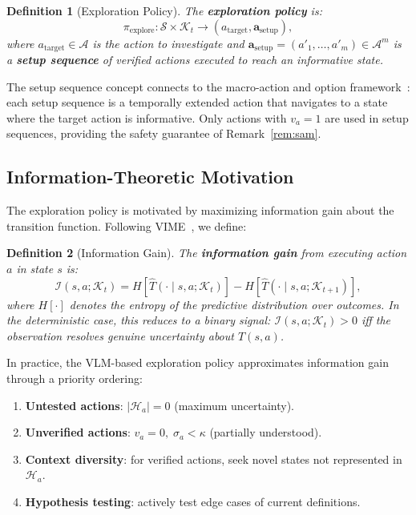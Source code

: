 \documentclass{article}
\newtheorem{definition}{Definition}
\newcommand{\calS}{\mathcal{S}}
\newcommand{\calA}{\mathcal{A}}
\newcommand{\calH}{\mathcal{H}}
\newcommand{\calI}{\mathcal{I}}
\newcommand{\calK}{\mathcal{K}}
\begin{document}
\begin{definition}[Exploration Policy]
\label{def:explore_policy}
The \textbf{exploration policy} is:
\begin{equation}
\pi_{\text{explore}} : \calS \times \calK_t \longrightarrow (a_{\text{target}}, \mathbf{a}_{\text{setup}}),
\end{equation}
where $a_{\text{target}} \in \calA$ is the action to investigate and $\mathbf{a}_{\text{setup}} = (a'_1, \ldots, a'_m) \in \calA^m$ is a \textbf{setup sequence} of verified actions executed to reach an informative state.
\end{definition}

The setup sequence concept connects to the macro-action and option framework~\cite{sutton1999between}: each setup sequence is a temporally extended action that navigates to a state where the target action is informative.  Only actions with $v_a = 1$ are used in setup sequences, providing the safety guarantee of Remark~\ref{rem:sam}.

\subsection{Information-Theoretic Motivation}
\label{sec:info_gain}

The exploration policy is motivated by maximizing information gain about the transition function.  Following VIME~\cite{houthooft2016vime}, we define:

\begin{definition}[Information Gain]
\label{def:info_gain}
The \textbf{information gain} from executing action $a$ in state $s$ is:
\begin{equation}
\calI(s, a; \calK_t) = H[\hat{T}(\cdot \mid s, a; \calK_t)] - H[\hat{T}(\cdot \mid s, a; \calK_{t+1})],
\end{equation}
where $H[\cdot]$ denotes the entropy of the predictive distribution over outcomes.  In the deterministic case, this reduces to a binary signal: $\calI(s, a; \calK_t) > 0$ iff the observation resolves genuine uncertainty about $T(s, a)$.
\end{definition}

In practice, the VLM-based exploration policy approximates information gain through a priority ordering:

\begin{enumerate}[nosep]
    \item \textbf{Untested actions}: $|\calH_a| = 0$ (maximum uncertainty).
    \item \textbf{Unverified actions}: $v_a = 0,\; \sigma_a < \kappa$ (partially understood).
    \item \textbf{Context diversity}: for verified actions, seek novel states not represented in $\calH_a$.
    \item \textbf{Hypothesis testing}: actively test edge cases of current definitions.
\end{enumerate}
\end{document}
